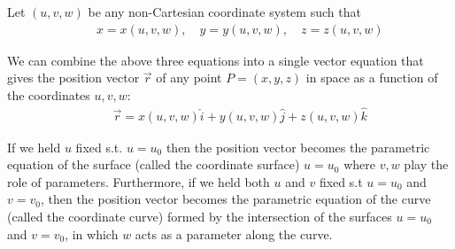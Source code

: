 \documentclass[12pt]{article}
\begin{document}
Let $(u,v,w)$ be any non-Cartesian coordinate system such that
\begin{eqnarray}
&& x = x(u,v,w), \quad y = y(u,v,w), \quad z = z(u,v,w) 
\end{eqnarray}

We can combine the above three equations into a single vector equation that gives the position vector $\vec{r}$ of any point $P=(x,y,z)$ in space as a function of the coordinates $u,v,w$:
\begin{eqnarray*}
&& \vec{r} = x(u,v,w)\hat{i} + y(u,v,w)\hat{j} + z(u,v,w)\hat{k}
\end{eqnarray*}

If we held $u$ fixed s.t. $u=u_0$ then the position vector becomes the parametric equation of the surface (called the coordinate surface) $u=u_0$ where $v,w$ play the role of parameters. Furthermore, if we held both $u$ and $v$ fixed s.t $u=u_0$ and $v=v_0$, then the position vector becomes the parametric equation of the curve (called the coordinate curve) formed by the intersection of the surfaces $u=u_0$ and $v=v_0$, in which $w$ acts as a parameter along the curve.
\end{document}
